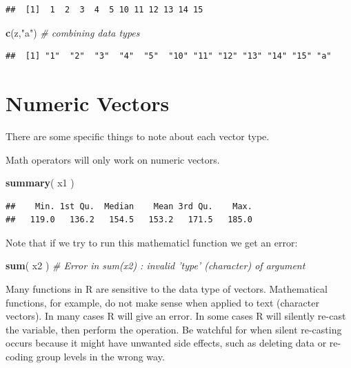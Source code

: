 \documentclass[]{book}
\newenvironment{Shaded}{\begin{snugshade}}{\end{snugshade}}
\newcommand{\CommentTok}[1]{\textcolor[rgb]{0.56,0.35,0.01}{\textit{#1}}}
\newcommand{\KeywordTok}[1]{\textcolor[rgb]{0.13,0.29,0.53}{\textbf{#1}}}
\newcommand{\NormalTok}[1]{#1}
\newcommand{\StringTok}[1]{\textcolor[rgb]{0.31,0.60,0.02}{#1}}
\theoremstyle{definition}
\theoremstyle{definition}
\theoremstyle{definition}
\theoremstyle{remark}
\begin{document}
\begin{verbatim}
##  [1]  1  2  3  4  5 10 11 12 13 14 15
\end{verbatim}

\begin{Shaded}
\begin{Highlighting}[]
\KeywordTok{c}\NormalTok{(z,}\StringTok{"a"}\NormalTok{)  }\CommentTok{# combining data types }
\end{Highlighting}
\end{Shaded}

\begin{verbatim}
##  [1] "1"  "2"  "3"  "4"  "5"  "10" "11" "12" "13" "14" "15" "a"
\end{verbatim}

\hypertarget{numeric-vectors}{%
\section{Numeric Vectors}\label{numeric-vectors}}

There are some specific things to note about each vector type.

Math operators will only work on numeric vectors.

\begin{Shaded}
\begin{Highlighting}[]
\KeywordTok{summary}\NormalTok{( x1 )}
\end{Highlighting}
\end{Shaded}

\begin{verbatim}
##    Min. 1st Qu.  Median    Mean 3rd Qu.    Max. 
##   119.0   136.2   154.5   153.2   171.5   185.0
\end{verbatim}

Note that if we try to run this mathematicl function we get an error:

\begin{Shaded}
\begin{Highlighting}[]
\KeywordTok{sum}\NormalTok{( x2 ) }\CommentTok{# Error in sum(x2) : invalid 'type' (character) of argument}
\end{Highlighting}
\end{Shaded}

Many functions in R are sensitive to the data type of vectors.
Mathematical functions, for example, do not make sense when applied to
text (character vectors). In many cases R will give an error. In some
cases R will silently re-cast the variable, then perform the operation.
Be watchful for when silent re-casting occurs because it might have
unwanted side effects, such as deleting data or re-coding group levels
in the wrong way.
\end{document}
